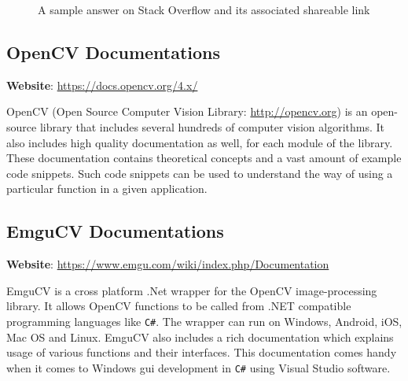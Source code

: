 \documentclass[a4paper,12pt]{report}%
\begin{document}
\begin{figure}[H]
	\centering
	\caption{A sample answer on Stack Overflow and its associated shareable link}
	\label{fig:stackof}
\end{figure}

\subsection{OpenCV Documentations}

\textbf{Website}: \url{https://docs.opencv.org/4.x/}

OpenCV (Open Source Computer Vision Library: \url{http://opencv.org}) is an open-source library that includes several hundreds of computer vision algorithms. It also includes high quality documentation as well, for each module of the library. These documentation contains theoretical concepts and a vast amount of example code snippets. Such code snippets can be used to understand the way of using a particular function in a given application. 

\subsection{EmguCV Documentations}
\label{EmguCV Documentations}

\textbf{Website}: \url{https://www.emgu.com/wiki/index.php/Documentation}

EmguCV is a  cross platform .Net wrapper for the OpenCV image-processing library. It allows OpenCV functions to be called from .NET compatible programming languages like {\tt C\#}. The wrapper can run on Windows, Android, iOS, Mac OS and Linux. EmguCV also includes a rich documentation which explains usage of various functions and their interfaces. This documentation comes handy when it comes to Windows \ac{gui} development in {\tt C\#} using Visual Studio software.\\
\end{document}
